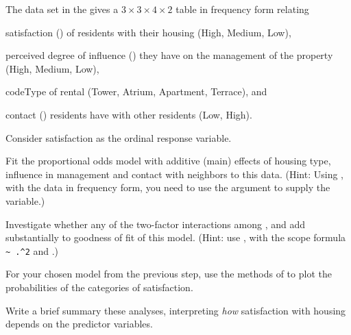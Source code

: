 \documentclass[11pt]{book}\usepackage[]{graphicx}\usepackage[]{color}
\begin{document}
\begin{Exercises}
\exercise The data set  in the  gives a $3 \times 3 \times 4 \times 2$
table in frequency form relating 
\begin{seriate}
 \item satisfaction () of residents with their housing (High, Medium, Low),
 \item perceived degree of influence () they have on the management of the property (High, Medium, Low),
 \item code{Type} of rental (Tower, Atrium, Apartment, Terrace), and
 \item contact () residents have with other residents (Low, High).
\end{seriate}
Consider satisfaction as the ordinal response variable.

  \begin{enumerate*}
    
    \item Fit the proportional odds model with additive (main) effects of housing type,
    influence in management and contact with neighbors to this data.
    (Hint: Using , with the data in frequency form, you need to use the
     argument to supply the  variable.)
    \item Investigate whether any of the two-factor interactions among ,
     and  add substantially to goodness of fit of this model.
    (Hint: use , with the scope formula \verb|~ .^2| and .)
    \item For your chosen model from the previous step, use the methods of
     to plot the probabilities of the categories of
    satisfaction.  
    \item Write a brief summary these analyses, interpreting \emph{how} satisfaction
    with housing depends on the predictor variables.
  \end{enumerate*}

\end{Exercises}
\end{document}
